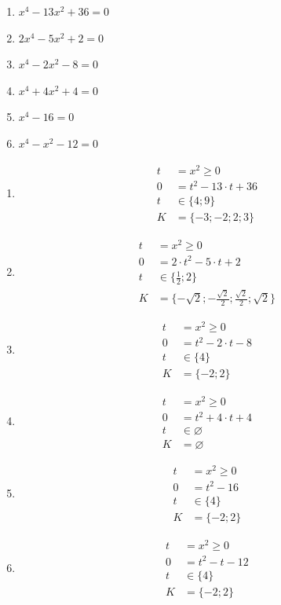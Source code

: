 \documentclass[11pt,a4paper]{article}
\begin{document}
\begin{zadaniReseniBox}[title={Domácí úkol}]
\begin{enumerate}[label=\alph*),itemsep=2pt]
\item $x^{4} - 13x^{2} + 36=0$
\item $2x^{4} - 5x^{2} + 2=0$
\item $x^{4} - 2x^{2} - 8=0$
\item $x^{4} + 4x^{2} + 4=0$
\item $x^{4} - 16=0$
\item $x^{4} - x^{2} - 12=0$
\end{enumerate}
\tcblower
\begin{enumerate}[label=\alph*),itemsep=2pt]
\item
\[\begin{aligned}
t&=x^2\ge0\\[2pt]
0&=t^{2} - 13 \cdot t + 36\\[2pt]
t&\in\{4;9\}\\[2pt]
K&=\{-3;-2;2;3\}
\end{aligned}\]
\item
\[\begin{aligned}
t&=x^2\ge0\\[2pt]
0&=2 \cdot t^{2} - 5 \cdot t + 2\\[2pt]
t&\in\{\frac{1}{2};2\}\\[2pt]
K&=\{- \sqrt{2};- \frac{\sqrt{2}}{2};\frac{\sqrt{2}}{2};\sqrt{2}\}
\end{aligned}\]
\item
\[\begin{aligned}
t&=x^2\ge0\\[2pt]
0&=t^{2} - 2 \cdot t - 8\\[2pt]
t&\in\{4\}\\[2pt]
K&=\{-2;2\}
\end{aligned}\]
\item
\[\begin{aligned}
t&=x^2\ge0\\[2pt]
0&=t^{2} + 4 \cdot t + 4\\[2pt]
t&\in\varnothing\\[2pt]
K&=\varnothing
\end{aligned}\]
\item
\[\begin{aligned}
t&=x^2\ge0\\[2pt]
0&=t^{2} - 16\\[2pt]
t&\in\{4\}\\[2pt]
K&=\{-2;2\}
\end{aligned}\]
\item
\[\begin{aligned}
t&=x^2\ge0\\[2pt]
0&=t^{2} - t - 12\\[2pt]
t&\in\{4\}\\[2pt]
K&=\{-2;2\}
\end{aligned}\]
\end{enumerate}
\end{zadaniReseniBox}
\end{document}
